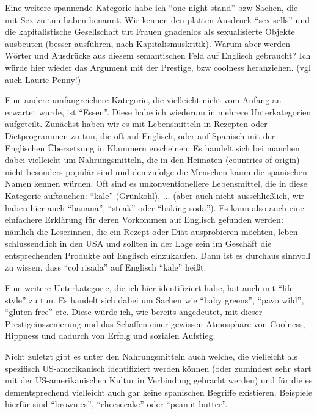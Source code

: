 Eine weitere spannende Kategorie habe ich ``one night stand'' bzw Sachen, die mit Sex zu tun haben benannt.
Wir kennen den platten Ausdruck ``sex sells'' und die kapitalistische Gesellschaft tut Frauen gnadenlos als sexualisierte Objekte ausbeuten (besser ausführen, nach Kapitalismuskritik).
Warum aber werden Wörter und Ausdrücke aus diesem semantischen Feld auf Englisch gebraucht?
Ich würde hier wieder das Argument mit der Prestige, bzw coolness heranziehen. (vgl auch Laurie Penny!)

Eine andere umfangreichere Kategorie, die vielleicht nicht vom Anfang an erwartet wurde, ist ``Essen''.
Diese habe ich wiederum in mehrere Unterkategorien aufgeteilt.
Zunächst haben wir es mit Lebensmitteln in Rezepten oder Dietprogrammen zu tun, die oft auf Englisch, oder auf Spanisch mit der Englischen Übersetzung in Klammern erscheinen.
Es handelt sich bei manchen dabei vielleicht um Nahrungsmitteln, die in den Heimaten (countries of origin) nicht besonders populär sind und demzufolge die Menschen kaum die spanischen Namen kennen würden.
Oft sind es unkonventionellere Lebensmittel, die in diese Kategorie auftauchen: ``kale'' (Grünkohl), ... (aber auch nicht ausschließlich, wir haben hier auch ``banana'', ``steak'' oder ``baking soda''). %
Es kann also auch eine einfachere Erklärung für deren Vorkommen auf Englisch gefunden werden:
nämlich die Leserinnen, die ein Rezept oder Diät ausprobieren möchten, leben schlussendlich in den USA und sollten in der Lage sein im Geschäft die entsprechenden Produkte auf Englisch einzukaufen.
Dann ist es durchaus sinnvoll zu wissen, dass ``col risada'' auf Englisch ``kale'' heißt.

Eine weitere Unterkategorie, die ich hier identifiziert habe, hat auch mit ``life style'' zu tun.
Es handelt sich dabei um Sachen wie ``baby greens'', ``pavo wild'', ``gluten free'' etc.
Diese würde ich, wie bereits angedeutet, mit dieser Prestigeinszenierung und das Schaffen einer gewissen Atmosphäre von Coolness, Hippness und dadurch von Erfolg und sozialen Aufstieg.

Nicht zuletzt gibt es unter den Nahrungsmitteln auch welche, die vielleicht als spezifisch US-amerikanisch identifiziert werden können (oder zumindest sehr start mit der US-amerikanischen Kultur in Verbindung gebracht werden) und für die es dementsprechend vielleicht auch gar keine spanischen Begriffe existieren.
Beispiele hierfür sind ``brownies'', ``cheesecake'' oder ``peanut butter''.

